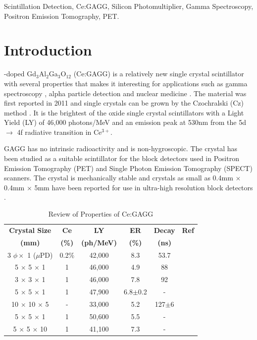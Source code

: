 \documentclass[journal]{IEEEtran}
\begin{document}
\begin{IEEEkeywords}
Scintillation Detection, Ce:GAGG, Silicon Photomultiplier, Gamma Spectroscopy, Positron Emission Tomography, PET.
\end{IEEEkeywords}

\section{Introduction}
-doped Gd$_{3}$Al$_{2}$Ga$_{3}$O$_{12}$ (Ce:GAGG) is a relatively new single crystal scintillator with several properties that makes it interesting for applications such as gamma spectroscopy \cite{gamma:iwan, gagg:orita}, alpha particle detection \cite{alpha:morishita, sipm:morishita} and nuclear medicine \cite{gagg:levin, gagg:seitz, gagg:fbk, gagg:schneider, gagg:kamada04}. The material was first reported in 2011 and single crystals can be grown by the Czochralski (Cz) method \cite{gagg:kamada01, gagg:kamada02}. It is the brightest of the oxide single crystal scintillators with a Light Yield (LY) of 46,000 photons/MeV and an emission peak at 530nm from the 5d $\rightarrow$ 4f radiative transition in Ce$^{3+}$. 

GAGG has no intrinsic radioactivity and is non-hygroscopic. The crystal has been studied as a suitable scintillator for the block detectors used in Positron Emission Tomography (PET) and Single Photon Emission Tomography (SPECT) scanners. The crystal is mechanically stable and crystals as small as 0.4mm $\times$ 0.4mm $\times$ 5mm have been reported for use in ultra-high resolution block detectors \cite{yamamoto:ultrahigh}.  


\begin{table}[bt]
\renewcommand{\arraystretch}{1.3}
\caption{Review of Properties of Ce:GAGG}
\label{tab:gagg_review}
\centering
\begin{tabular}{ c | c | c | c | c | c }
\hline
\bfseries Crystal Size & \bfseries Ce & \bfseries LY & \bfseries ER & \bfseries Decay & \bfseries Ref \\
\bfseries (mm) & \bfseries (\%) & \bfseries (ph/MeV) & \bfseries (\%) & \bfseries (ns) & \\
\hline \hline
3 $\phi{} \times{}$ 1 ($\mu$PD) & 0.2\% & 42,000 & 8.3 & 53.7 &\cite{kamada:sc_scint} \\
\hline
5 $\times$ 5 $\times$ 1 & 1 & 46,000 & 4.9 & 88 & \cite{gagg:kamada02} \\
\hline
3 $\times$ 3 $\times$ 1 & 1 & 46,000 & 7.8 & 92 & \cite{gagg:kamada03} \\
\hline
5 $\times$ 5 $\times$ 1 & 1 & 47,900 & 6.8$\pm{}$0.2 & - & \cite{sakthong:gagg} \\
\hline
10 $\times$ 10 $\times$ 5 & - & 33,000 & 5.2 & 127$\pm$6 & \cite{gamma:iwan} \\
\hline 
5 $\times$ 5 $\times$ 1 & 1 & 50,600 & 5.5 & - &\\
5 $\times$ 5 $\times$ 10 & 1 & 41,100 & 7.3 & - & \cite{prusa:lightyeild} \\
\hline
\end{tabular}
\end{table} 
\end{document}
